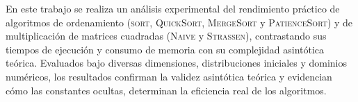 En este trabajo se realiza un análisis experimental del rendimiento práctico de algoritmos de ordenamiento (\textsc{sort}, \textsc{QuickSort}, \textsc{MergeSort} y \textsc{PatienceSort}) y de multiplicación de matrices cuadradas (\textsc{Naive} y \textsc{Strassen}), contrastando sus tiempos de ejecución y consumo de memoria con su complejidad asintótica teórica. Evaluados bajo diversas dimensiones, distribuciones iniciales y dominios numéricos, los resultados confirman la validez asintótica teórica y evidencian cómo las constantes ocultas, determinan la eficiencia real de los algoritmos.